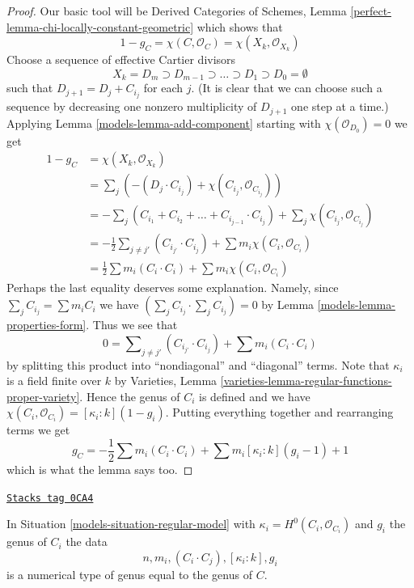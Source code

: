 \begin{proof}

Our basic tool will be Derived Categories of Schemes, Lemma
\ref{perfect-lemma-chi-locally-constant-geometric}
which shows that
$$
1 - g_C = \chi(C, \mathcal{O}_C) =
\chi(X_k, \mathcal{O}_{X_k})
$$
Choose a sequence of effective Cartier divisors
$$
X_k = D_m \supset D_{m - 1} \supset \ldots \supset D_1 \supset D_0 = \emptyset
$$
such that $D_{j + 1} = D_j + C_{i_j}$ for each $j$. (It is clear that
we can choose such a sequence by decreasing one nonzero multiplicity
of $D_{j + 1}$ one step at a time.) Applying Lemma \ref{models-lemma-add-component}
starting with $\chi(\mathcal{O}_{D_0}) = 0$ we get
\begin{align*}
1 - g_C
& =
\chi(X_k, \mathcal{O}_{X_k}) \\
& =
\sum\nolimits_j
\left(-(D_j \cdot C_{i_j}) +  \chi(C_{i_j}, \mathcal{O}_{C_{i_j}})\right) \\
& =
- \sum\nolimits_j
(C_{i_1} + C_{i_2} + \ldots + C_{i_{j - 1}} \cdot C_{i_j}) +
\sum\nolimits_j \chi(C_{i_j}, \mathcal{O}_{C_{i_j}}) \\
& =
-\frac{1}{2}\sum\nolimits_{j \not = j'} (C_{i_{j'}} \cdot C_{i_j}) +
\sum m_i \chi(C_i, \mathcal{O}_{C_i}) \\
& =
\frac{1}{2} \sum m_i(C_i \cdot C_i) + \sum m_i \chi(C_i, \mathcal{O}_{C_i})
\end{align*}
Perhaps the last equality deserves some explanation. Namely, since
$\sum_j C_{i_j} = \sum m_i C_i$ we have
$(\sum_j C_{i_j} \cdot \sum_j C_{i_j}) = 0$ by
Lemma \ref{models-lemma-properties-form}. Thus we see that
$$
0 = \sum\nolimits_{j \not = j'} (C_{i_{j'}} \cdot C_{i_j}) +
\sum m_i(C_i \cdot C_i)
$$
by splitting this product into ``nondiagonal'' and ``diagonal'' terms.
Note that $\kappa_i$ is a field finite over $k$ by
Varieties, Lemma \ref{varieties-lemma-regular-functions-proper-variety}.
Hence the genus of $C_i$ is defined and we have
$\chi(C_i, \mathcal{O}_{C_i}) = [\kappa_i : k](1 - g_i)$.
Putting everything together and rearranging terms we get
$$
g_C = - \frac{1}{2}\sum m_i(C_i \cdot C_i) +
\sum m_i[\kappa_i : k](g_i - 1) + 1
$$
which is what the lemma says too.
\end{proof}

\begin{lemma}
\label{models-lemma-numerical-type-of-model}
\href{https://stacks.math.columbia.edu/tag/0CA4}{\texttt{Stacks tag 0CA4}}

In Situation \ref{models-situation-regular-model} with
$\kappa_i = H^0(C_i, \mathcal{O}_{C_i})$ and $g_i$ the genus of $C_i$
the data
$$
n, m_i, (C_i \cdot C_j), [\kappa_i : k], g_i
$$
is a numerical type of genus equal to the genus of $C$.
\end{lemma}

